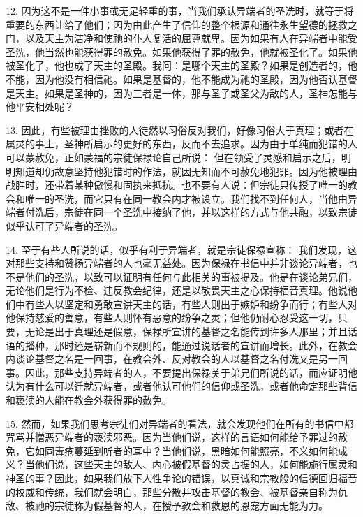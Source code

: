 12. 因为这不是一件小事或无足轻重的事，当我们承认异端者的圣洗时，就等于将重要的东西让给了他们；因为由此产生了信仰的整个根源和通往永生望德的拯救之门，以及天主为洁净和使祂的仆人复活的屈尊就卑。因为如果有人在异端者中能受圣洗，他当然也能获得罪的赦免。如果他获得了罪的赦免，他就被圣化了。如果他被圣化了，他也成了天主的圣殿。我问：是哪个天主的圣殿？如果是创造者的，他不能，因为他没有相信祂。如果是基督的，他不能成为祂的圣殿，因为他否认基督是天主。如果是圣神的，因为三者是一体，那与圣子或圣父为敌的人，圣神怎能与他平安相处呢？\par

13. 因此，有些被理由挫败的人徒然以习俗反对我们，好像习俗大于真理；或者在属灵的事上，圣神所启示的更好的东西，反而不去追求。因为由于单纯而犯错的人可以蒙赦免，正如蒙福的宗徒保禄论自己所说： 但在领受了灵感和启示之后，明明知道却仍故意坚持他犯错时的作法，就因无知而不可赦免地犯罪。因为他被理由战胜时，还带着某种傲慢和固执来抵抗。也不要有人说：但宗徒只传授了唯一的教会和唯一的圣洗，而它只有在同一教会内才被设立。我们找不到任何人，当他由异端者付洗后，宗徒在同一个圣洗中接纳了他，并以这样的方式与他共融，以致宗徒似乎认可了异端者的圣洗。\par

14. 至于有些人所说的话，似乎有利于异端者，就是宗徒保禄宣称： 我们发现，这对那些支持和赞扬异端者的人也毫无益处。因为保禄在书信中并非谈论异端者，也不是他们的圣洗，以致可以证明有任何与此相关的事被提及。他是在谈论弟兄们，无论他们是行为不检、违反教会纪律，还是以敬畏天主之心保持福音真理。他说他们中有些人以坚定和勇敢宣讲天主的话，有些人则出于嫉妒和纷争而行；有些人对他保持慈爱的善意，有些人则怀有恶意的纷争之灵；但他仍耐心忍受这一切，只要，无论是出于真理还是假意，保禄所宣讲的基督之名能传到许多人那里；并且话语的播种，那时还是崭新而不规则的，能通过说话者的宣讲而增长。此外，在教会内谈论基督之名是一回事，在教会外、反对教会的人以基督之名付洗又是另一回事。因此，那些支持异端者的人，不要提出保禄关于弟兄们所说的话，而应证明他认为有什么可以迁就异端者，或者他认可他们的信仰或圣洗，或者他命定那些背信和亵渎的人能在教会外获得罪的赦免。\par

15. 然而，如果我们思考宗徒们对异端者的看法，就会发现他们在所有的书信中都咒骂并憎恶异端者的亵渎邪恶。因为当他们说，这样的言语如何能给予罪过的赦免，它如同毒疮蔓延到听者的耳中？当他们说，黑暗如何能照亮，不义如何能成义？当他们说，这些天主的敌人、内心被假基督的灵占据的人，如何能施行属灵和神圣的事？因此，如果我们放下人性争论的错误，以真诚和宗教般的信德回归福音的权威和传统，我们就会明白，那些分散并攻击基督的教会、被基督亲自称为仇敌、被祂的宗徒称为假基督的人，在授予教会和救恩的恩宠方面无能为力。\par

